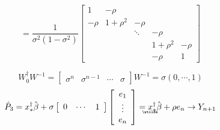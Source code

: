 \documentclass{article}
\begin{document}
\begin{equation*}
=\frac{1}{\sigma ^{2}\left( 1-\sigma ^{2}\right) }\left[ 
\begin{array}{ccccc}
1 & -\rho  &  &  &  \\ 
-\rho  & 1+\rho ^{2} & -\rho  &  &  \\ 
&  & \ddots  & -\rho  &  \\ 
&  &  & 1+\rho ^{2} & -\rho  \\ 
&  &  & -\rho  & 1%
\end{array}%
\right] 
\end{equation*}

\begin{equation*}
W_{0}^{\dagger }W^{-1}=\left[ 
\begin{array}{cccc}
\sigma ^{n} & \sigma ^{n-1} & \cdots  & \sigma 
\end{array}%
\right] W^{-1}=\sigma \left( 0,\cdots ,1\right) 
\end{equation*}%
\begin{equation*}
\hat{P}_{3}=x_{\ast }^{\dagger }\hat{\beta}+\sigma \left[ 
\begin{array}{ccc}
0 & \cdots  & 1%
\end{array}%
\right] \left[ 
\begin{array}{c}
e_{1} \\ 
\vdots  \\ 
e_{n}%
\end{array}%
\right] =%
\underaccent{\wtilde}{x}%
_{\ast }^{\dagger }\hat{\beta}+\rho e_{n}\rightarrow Y_{n+1}
\end{equation*}
\end{document}
